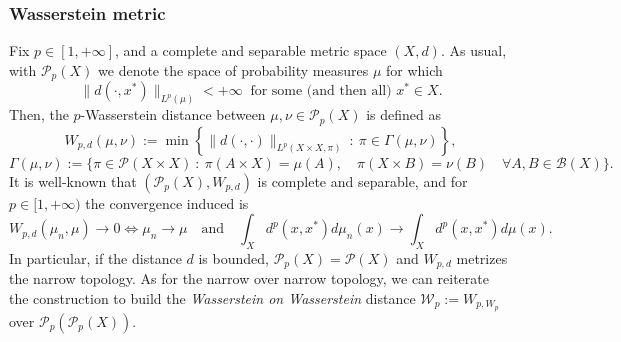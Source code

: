 \documentclass[10pt,leqno]{amsart}
\numberwithin{equation}{section}
\newcommand{\PP}{\mathcal{P}}
\newcommand{\X}{\textit{X}}
\begin{document}
\subsubsection{Wasserstein metric} Fix $p\in [1,+\infty]$, and a complete and separable metric space $(X,d)$. As usual, with $\PP_p(X)$ we denote the space of probability measures $\mu$ for which 
\begin{equation}
    \|d(\cdot,x^*)\|_{L^p(\mu)}<+\infty \ \text{ for some (and then all) } x^* \in X.
\end{equation}
Then, the $p$-Wasserstein distance between $\mu,\nu\in\PP_p(X)$ is defined as 
\[W_{p,d}(\mu,\nu) := \min \left\{ \|d(\cdot,\cdot)\|_{L^p(\X\times X,\pi)} \ : \ \pi \in \Gamma(\mu,\nu) \right\},\]
\[\Gamma(\mu,\nu):= \Big\{\pi \in \PP(X\times X) \ : \ \pi(A\times X) = \mu(A), \quad \pi(X\times B)  = \nu(B) \quad \forall A,B \in \mathcal{B}(X)\Big\}.\]
It is well-known \cite[Proposition 7.1.5]{ambrosio2005gradient} that $(\PP_p(X),W_{p,d})$ is complete and separable, and for $p\in[1,+\infty)$ the convergence induced is 
\[W_{p,d}(\mu_n,\mu) \to 0 \iff \mu_n \to \mu \quad \text{and} \quad \int_X d^p(x,x^*) d\mu_n(x) \to \int_X d^p(x,x^*) d\mu(x).\]
In particular, if the distance $d$ is bounded, $\PP_p(X) = \PP(X)$ and $W_{p,d}$ metrizes the narrow topology.
As for the narrow over narrow topology, we can reiterate the construction to build the \textit{Wasserstein on Wasserstein} distance $\mathcal{W}_p:= W_{p,W_p}$ over $\PP_p(\PP_p(X))$.
\end{document}
